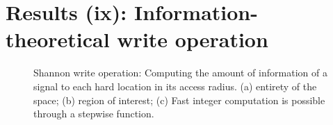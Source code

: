 





\chapter{Results (ix): Information-theoretical write operation}

\begin{figure}[h!]
  \centering



  \caption{Shannon write operation:  Computing the amount of information of a signal to each hard location in its access radius. (a) entirety of the space; (b) region of interest; (c) Fast integer computation is possible through a stepwise function.}
  \label{fig:info-theory-hypothesis}
\end{figure}

